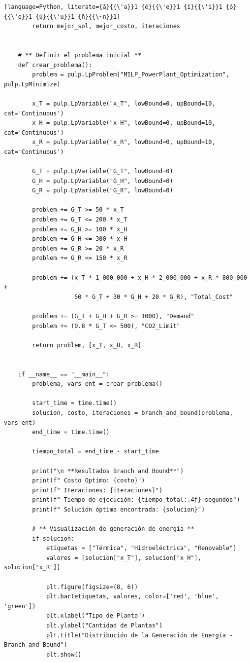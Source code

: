 \documentclass{article}
\begin{document}
\begin{lstlisting}[language=Python, literate={á}{{\'a}}1 {é}{{\'e}}1 {í}{{\'i}}1 {ó}{{\'o}}1 {ú}{{\'u}}1 {ñ}{{\~n}}1]
        return mejor_sol, mejor_costo, iteraciones
    
    
    # ** Definir el problema inicial **
    def crear_problema():
        problem = pulp.LpProblem("MILP_PowerPlant_Optimization", pulp.LpMinimize)
    
        x_T = pulp.LpVariable("x_T", lowBound=0, upBound=10, cat='Continuous')
        x_H = pulp.LpVariable("x_H", lowBound=0, upBound=10, cat='Continuous')
        x_R = pulp.LpVariable("x_R", lowBound=0, upBound=10, cat='Continuous')
    
        G_T = pulp.LpVariable("G_T", lowBound=0)
        G_H = pulp.LpVariable("G_H", lowBound=0)
        G_R = pulp.LpVariable("G_R", lowBound=0)
    
        problem += G_T >= 50 * x_T
        problem += G_T <= 200 * x_T
        problem += G_H >= 100 * x_H
        problem += G_H <= 300 * x_H
        problem += G_R >= 20 * x_R
        problem += G_R <= 150 * x_R
    
        problem += (x_T * 1_000_000 + x_H * 2_000_000 + x_R * 800_000 +
                    50 * G_T + 30 * G_H + 20 * G_R), "Total_Cost"
    
        problem += (G_T + G_H + G_R >= 1000), "Demand"
        problem += (0.8 * G_T <= 500), "CO2_Limit"
    
        return problem, [x_T, x_H, x_R]
    
    
    if __name__ == "__main__":
        problema, vars_ent = crear_problema()
        
        start_time = time.time()
        solucion, costo, iteraciones = branch_and_bound(problema, vars_ent)
        end_time = time.time()
    
        tiempo_total = end_time - start_time
    
        print("\n **Resultados Branch and Bound**")
        print(f" Costo Optimo: {costo}")
        print(f" Iteraciones: {iteraciones}")
        print(f" Tiempo de ejecución: {tiempo_total:.4f} segundos")
        print(f" Solución óptima encontrada: {solucion}")
    
        # ** Visualización de generación de energía **
        if solucion:
            etiquetas = ["Térmica", "Hidroeléctrica", "Renovable"]
            valores = [solucion["x_T"], solucion["x_H"], solucion["x_R"]]
    
            plt.figure(figsize=(8, 6))
            plt.bar(etiquetas, valores, color=['red', 'blue', 'green'])
            plt.xlabel("Tipo de Planta")
            plt.ylabel("Cantidad de Plantas")
            plt.title("Distribución de la Generación de Energía - Branch and Bound")
            plt.show()
    
\end{lstlisting}
\end{document}
